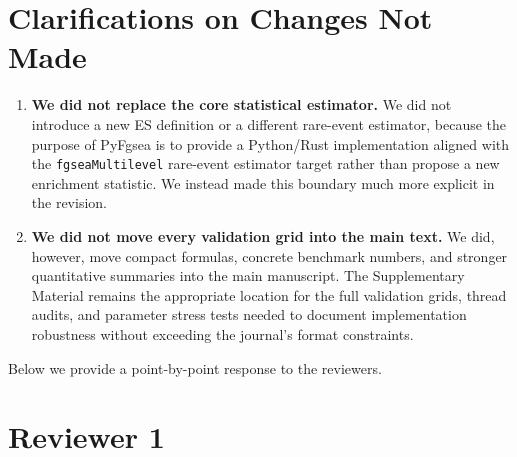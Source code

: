 \documentclass[11pt]{article}
\begin{document}
\section*{Clarifications on Changes Not Made}

\begin{enumerate}[leftmargin=1.5em]
\item \textbf{We did not replace the core statistical estimator.} We did not introduce a new ES definition or a different rare-event estimator, because the purpose of PyFgsea is to provide a Python/Rust implementation aligned with the \texttt{fgseaMultilevel} rare-event estimator target rather than propose a new enrichment statistic. We instead made this boundary much more explicit in the revision.

\item \textbf{We did not move every validation grid into the main text.} We did, however, move compact formulas, concrete benchmark numbers, and stronger quantitative summaries into the main manuscript. The Supplementary Material remains the appropriate location for the full validation grids, thread audits, and parameter stress tests needed to document implementation robustness without exceeding the journal's format constraints.
\end{enumerate}

Below we provide a point-by-point response to the reviewers.

\section*{Reviewer 1}
\end{document}
